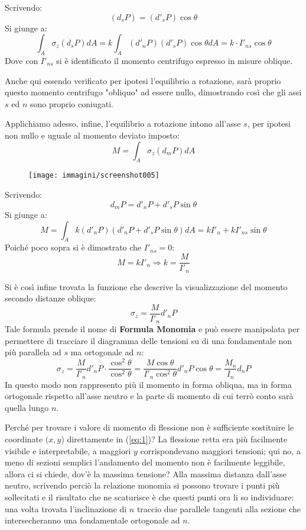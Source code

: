 \documentclass{article}
\begin{document}
\begin{adjustwidth}{2in}{}
		Scrivendo:
		\[(d_sP) = (d'_sP)\cos\theta\]
		Si giunge a:
		\[ \int_A\sigma_z(d_sP)dA = k\int_A(d'_nP)(d'_sP)\cos\theta dA = k \cdot I'_{ns}\cos\theta\]
		Dove con $I'_{ns}$ si è identificato il momento centrifugo espresso in misure oblique.
		
		Anche qui essendo verificato per ipotesi l'equilibrio a rotazione, sarà proprio questo momento centrifugo "obliquo" ad essere nullo, dimostrando così che gli assi $s$ ed $n$ sono proprio coniugati. \newline 
		
		Applichiamo adesso, infine, l'equilibrio a rotazione intono all'asse $s$, per ipotesi non nullo e uguale al momento deviato imposto: 
		\[M = \int_A\sigma_z(d_mP)dA \]
		
\begin{figure}[H]
	\centering
	\texttt{[image: immagini/screenshot005]}
	\label{fig:screenshot005}
\end{figure}

		Scrivendo:
		\[ d_mP = d'_nP + d'_sP\sin\theta\]
		Si giunge a: 
		\[M = \int_Ak(d'_nP)(d'_nP + d'_sP\sin\theta)dA = kI'_n + kI'_{ns}\sin\theta\]
		Poiché poco sopra si è dimostrato che $I'_{ns}=0$:
		\[M=kI'_n \Rightarrow k =\dfrac{M}{I'_n}\]
		
		Si è così infine trovata la funzione che descrive la visualizzazione del momento secondo distanze oblique:
		\[ \sigma_z = \dfrac{M}{I'_n}d'_nP\]
		Tale formula prende il nome di \textbf{Formula Monomia} e può essere manipolata per permettere di tracciare il diagramma delle tensioni su di una fondamentale non più parallela ad $s$ ma ortogonale ad $n$:
		\[ \sigma_z =\dfrac{M}{I'_n}d'_nP \cdot  \dfrac{\cos^2\theta}{\cos^2\theta}= \dfrac{M\cos\theta}{I'_n\cos^2\theta}d'_nP\cos\theta = \dfrac{M_n}{I_n}d_nP\]
		In questo modo non rappresento più il momento in forma obliqua, ma in forma ortogonale rispetto all'asse neutro e la parte di momento di cui terrò conto sarà quella lungo $n$. \newline 
		
		Perché per trovare i valore di momento di flessione non è sufficiente sostituire le coordinate $(x,y$) direttamente in (\ref{eq:1})? La flessione retta era più facilmente visibile e interpretabile, a maggiori $y$ corrispondevano maggiori tensioni; qui no, a meno di sezioni semplici l'andamento del momento non è facilmente leggibile, allora ci si chiede, dov'è la massima tensione? Alla massima distanza dall'asse neutro, scrivendo perciò la relazione monomia si possono trovare i punti più sollecitati e il risultato che ne scaturisce è che questi punti ora li so individuare: una volta trovata l'inclinazione di $n$ traccio due parallele tangenti alla sezione che intersecheranno una fondamentale ortogonale ad $n$. \newline 
		

\end{adjustwidth}
\end{document}

